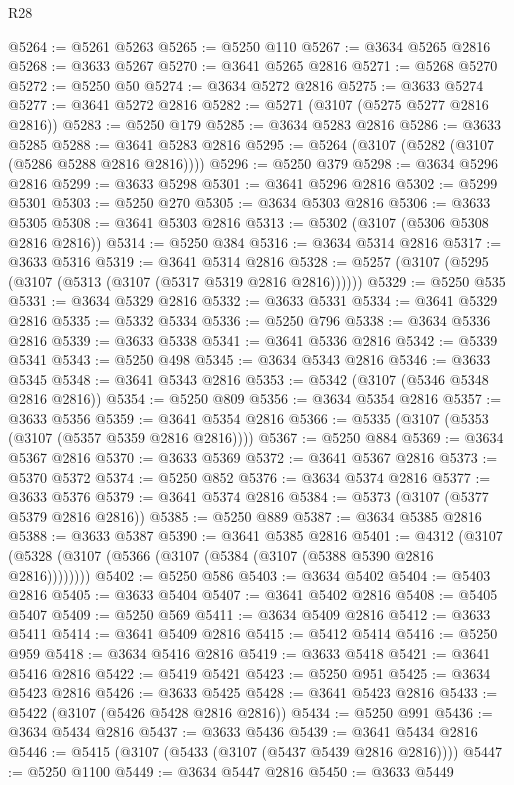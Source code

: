 \begin{lexlean}{R28}
\begin{coremodule}
@5264 := @5261 @5263
@5265 := @5250 @110
@5267 := @3634 @5265 @2816
@5268 := @3633 @5267
@5270 := @3641 @5265 @2816
@5271 := @5268 @5270
@5272 := @5250 @50
@5274 := @3634 @5272 @2816
@5275 := @3633 @5274
@5277 := @3641 @5272 @2816
@5282 := @5271 (@3107 (@5275 @5277 @2816 @2816))
@5283 := @5250 @179
@5285 := @3634 @5283 @2816
@5286 := @3633 @5285
@5288 := @3641 @5283 @2816
@5295 := @5264 (@3107 (@5282 (@3107 (@5286 @5288 @2816 @2816))))
@5296 := @5250 @379
@5298 := @3634 @5296 @2816
@5299 := @3633 @5298
@5301 := @3641 @5296 @2816
@5302 := @5299 @5301
@5303 := @5250 @270
@5305 := @3634 @5303 @2816
@5306 := @3633 @5305
@5308 := @3641 @5303 @2816
@5313 := @5302 (@3107 (@5306 @5308 @2816 @2816))
@5314 := @5250 @384
@5316 := @3634 @5314 @2816
@5317 := @3633 @5316
@5319 := @3641 @5314 @2816
@5328 := @5257 (@3107 (@5295 (@3107 (@5313 (@3107 (@5317 @5319 @2816 @2816))))))
@5329 := @5250 @535
@5331 := @3634 @5329 @2816
@5332 := @3633 @5331
@5334 := @3641 @5329 @2816
@5335 := @5332 @5334
@5336 := @5250 @796
@5338 := @3634 @5336 @2816
@5339 := @3633 @5338
@5341 := @3641 @5336 @2816
@5342 := @5339 @5341
@5343 := @5250 @498
@5345 := @3634 @5343 @2816
@5346 := @3633 @5345
@5348 := @3641 @5343 @2816
@5353 := @5342 (@3107 (@5346 @5348 @2816 @2816))
@5354 := @5250 @809
@5356 := @3634 @5354 @2816
@5357 := @3633 @5356
@5359 := @3641 @5354 @2816
@5366 := @5335 (@3107 (@5353 (@3107 (@5357 @5359 @2816 @2816))))
@5367 := @5250 @884
@5369 := @3634 @5367 @2816
@5370 := @3633 @5369
@5372 := @3641 @5367 @2816
@5373 := @5370 @5372
@5374 := @5250 @852
@5376 := @3634 @5374 @2816
@5377 := @3633 @5376
@5379 := @3641 @5374 @2816
@5384 := @5373 (@3107 (@5377 @5379 @2816 @2816))
@5385 := @5250 @889
@5387 := @3634 @5385 @2816
@5388 := @3633 @5387
@5390 := @3641 @5385 @2816
@5401 := @4312 (@3107 (@5328 (@3107 (@5366 (@3107 (@5384 (@3107 (@5388 @5390 @2816 @2816))))))))
@5402 := @5250 @586
@5403 := @3634 @5402
@5404 := @5403 @2816
@5405 := @3633 @5404
@5407 := @3641 @5402 @2816
@5408 := @5405 @5407
@5409 := @5250 @569
@5411 := @3634 @5409 @2816
@5412 := @3633 @5411
@5414 := @3641 @5409 @2816
@5415 := @5412 @5414
@5416 := @5250 @959
@5418 := @3634 @5416 @2816
@5419 := @3633 @5418
@5421 := @3641 @5416 @2816
@5422 := @5419 @5421
@5423 := @5250 @951
@5425 := @3634 @5423 @2816
@5426 := @3633 @5425
@5428 := @3641 @5423 @2816
@5433 := @5422 (@3107 (@5426 @5428 @2816 @2816))
@5434 := @5250 @991
@5436 := @3634 @5434 @2816
@5437 := @3633 @5436
@5439 := @3641 @5434 @2816
@5446 := @5415 (@3107 (@5433 (@3107 (@5437 @5439 @2816 @2816))))
@5447 := @5250 @1100
@5449 := @3634 @5447 @2816
@5450 := @3633 @5449

\end{coremodule}
\end{lexlean}
